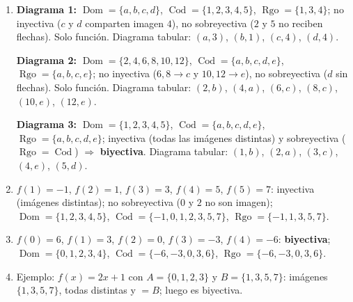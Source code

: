 \documentclass[12pt, letterpaper]{article}
\begin{document}
  \begin{enumerate}[leftmargin=*, label=\textbf{\arabic*.}]
    \item \textbf{Diagrama 1:} $\operatorname{Dom} = \{a,b,c,d\}$, $\operatorname{Cod} = \{1,2,3,4,5\}$, $\operatorname{Rgo} = \{1,3,4\}$; no inyectiva ($c$ y $d$ comparten imagen $4$), no sobreyectiva ($2$ y $5$ no reciben flechas). Solo función. Diagrama tabular: $(a,3)$, $(b,1)$, $(c,4)$, $(d,4)$.

          \textbf{Diagrama 2:} $\operatorname{Dom} = \{2,4,6,8,10,12\}$, $\operatorname{Cod} = \{a,b,c,d,e\}$, $\operatorname{Rgo} = \{a,b,c,e\}$; no inyectiva ($6,8 \to c$ y $10,12 \to e$), no sobreyectiva ($d$ sin flechas). Solo función. Diagrama tabular: $(2,b)$, $(4,a)$, $(6,c)$, $(8,c)$, $(10,e)$, $(12,e)$.

          \textbf{Diagrama 3:} $\operatorname{Dom} = \{1,2,3,4,5\}$, $\operatorname{Cod} = \{a,b,c,d,e\}$, $\operatorname{Rgo} = \{a,b,c,d,e\}$; inyectiva (todas las imágenes distintas) y sobreyectiva ($\operatorname{Rgo} = \operatorname{Cod}$) $\Rightarrow$ \textbf{biyectiva}. Diagrama tabular: $(1,b)$, $(2,a)$, $(3,c)$, $(4,e)$, $(5,d)$.

    \item $f(1)=-1$, $f(2)=1$, $f(3)=3$, $f(4)=5$, $f(5)=7$: inyectiva (imágenes distintas); no sobreyectiva ($0$ y $2$ no son imagen); $\operatorname{Dom} = \{1,2,3,4,5\}$, $\operatorname{Cod} = \{-1,0,1,2,3,5,7\}$, $\operatorname{Rgo} = \{-1,1,3,5,7\}$.

    \item $f(0)=6$, $f(1)=3$, $f(2)=0$, $f(3)=-3$, $f(4)=-6$: \textbf{biyectiva}; $\operatorname{Dom} = \{0,1,2,3,4\}$, $\operatorname{Cod} = \{-6,-3,0,3,6\}$, $\operatorname{Rgo} = \{-6,-3,0,3,6\}$.

    \item Ejemplo: $f(x) = 2x + 1$ con $A = \{0,1,2,3\}$ y $B = \{1,3,5,7\}$: imágenes $\{1,3,5,7\}$, todas distintas y $= B$; luego es biyectiva.
  \end{enumerate}

\fi
\end{document}
